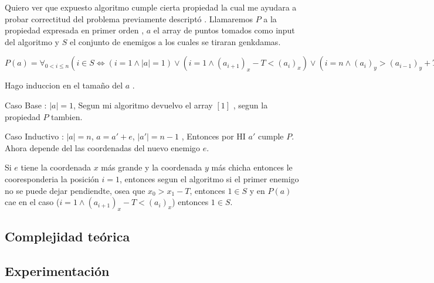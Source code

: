         Quiero ver que expuesto algoritmo cumple cierta propiedad la cual me ayudara a probar correctitud del problema previamente descriptó . Llamaremos $P$ a la propiedad expresada en primer orden , $a$ el array de puntos tomados como input del algoritmo y $S$ el conjunto de enemigos a los cuales se tiraran genkdamas. 
        
        $P(a) = \forall_{0 < i \leq n} ( i \in S  \iff (i = 1 \land |a| = 1 ) \lor ( i = 1  \land (a_{i+1})_x - T  < (a_i)_x ) \lor ( i = n \land (a_i)_y > (a_{i - 1})_y + T ) \lor ( (1 < i < n) \land ( (a_{i+1})_x - T  < (a_i)_x ) ) \land ( (a_i)_y > (a_{i - 1})_y + T ) ) )  $
        
        Hago induccion en el tamaño del $a$ .


        Caso Base : $|a| = 1$, Segun mi algoritmo devuelvo el array $[1]$ , segun la propiedad $P$ tambien.

        Caso Inductivo : $|a| = n$, $a = a' + e $, $|a'| = n - 1$ , Entonces por HI $a'$ cumple $P$. Ahora depende del las coordenadas del nuevo enemigo $e$. 

        Si $e$ tiene la coordenada $x$ más grande y la coordenada $y$ más chicha entonces le cooresponderia la posición $i = 1$, entonces segun el algoritmo si el primer enemigo no se puede dejar pendiendte, osea que $x_0 > x_1  - T$, entonces $1 \in S$ y en $P(a)$ cae en el caso  ($i = 1  \land (a_{i+1})_x - T  < (a_i)_x$) entonces $1 \in S$.





       
    \subsection{Complejidad teórica}
         
       


    \subsection{Experimentación}
